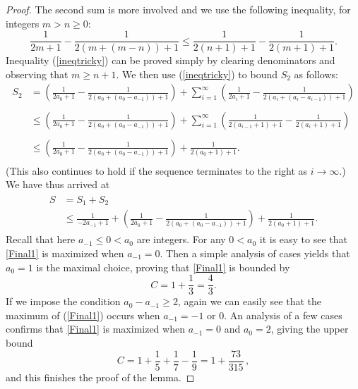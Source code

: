 \documentclass[reqno]{amsart}
\theoremstyle{definition}
\theoremstyle{remark}
\numberwithin{equation}{section}
\begin{document}
\begin{proof}
The second sum is more involved and we use the following inequality, for  integers $m > n\geq 0$:
\begin{equation}\label{ineqtricky}
 \frac{1}{2m + 1} - \frac{1}{2( m + (m - n)) + 1} \leq \frac{1}{2(n+1) +1} - \frac{1}{2(m+1) + 1}.
\end{equation}
Inequality (\ref{ineqtricky}) can be proved simply by clearing denominators and observing that $m \geq n+1$.
We then use (\ref{ineqtricky}) to bound $S_2$ as follows:
\begin{align*}
S_2 &=  \left(\frac{1}{2a_0 + 1} - \frac{1}{2( a_0 + (a_0 - a_{-1})) + 1}\right) + \sum_{i=1}^{\infty}\left(\frac{1}{2a_i + 1} - \frac{1}{2( a_i + (a_i - a_{i-1})) + 1}\right)\\
\\
& \leq \left(\frac{1}{2a_0 + 1} - \frac{1}{2( a_0 + (a_0 - a_{-1})) + 1}\right) + \sum_{i=1}^{\infty} \left(\frac{1}{2(a_{i-1}+1) +1} - \frac{1}{2(a_i+1) + 1}\right)\\
\\
& \leq  \left(\frac{1}{2a_0 + 1} - \frac{1}{2( a_0 + (a_0 - a_{-1})) + 1}\right)+ \frac{1}{2(a_{0}+1) +1}.\\
\end{align*}
(This also continues to hold if the sequence terminates to the right as $i \to \infty$.)
We have thus arrived at 
\begin{align}\label{Final1}
\begin{split}
S & = S_1 + S_2 \\
& \leq  \frac{1}{-2a_{-1} + 1} + \left(\frac{1}{2a_0 + 1} - \frac{1}{2( a_0 + (a_0 - a_{-1})) + 1}\right)+ \frac{1}{2(a_{0}+1) +1}.
\end{split}
\end{align}
Recall that here $a_{-1} \leq 0 < a_0$ are integers. For any $0<a_0$ it is easy to see that \eqref{Final1} is maximized when $a_{-1}=0$. Then a simple analysis of cases yields that $a_0=1$ is the maximal choice, proving that \eqref{Final1} is bounded by 
$$C = 1 + \frac{1}{3} = \frac{4}{3}.$$
If we impose the condition $a_0 - a_{-1} \geq 2$, again we can easily see that the maximum of (\ref{Final1}) occurs when $a_{-1} = -1$ or $0$. An analysis of a few cases confirms that \eqref{Final1} is maximized when $a_{-1} = 0$  and $a_0 = 2$, giving the upper bound 
\begin{equation}\label{C2}
C = 1 + \frac{1}{5} + \frac{1}{7} - \frac{1}{9}= 1 + \frac{73}{315}\,,
\end{equation}
and this finishes the proof of the lemma.
\end{proof}
\end{document}

